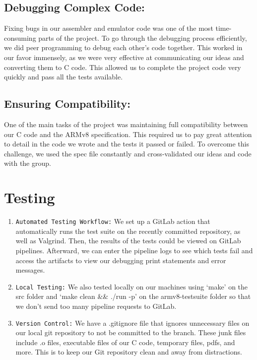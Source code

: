 \documentclass[11pt]{article}
\begin{document}
\subsection{Debugging Complex Code:}
Fixing bugs in our assembler and emulator code was one of the most time-consuming parts of the project. To go through the debugging process efficiently, we did peer programming to debug each other's code together. This worked in our favor immensely, as we were very effective at communicating our ideas and converting them to C code. This allowed us to complete the project code very quickly and pass all the tests available. 

\subsection{Ensuring Compatibility:}
One of the main tasks of the project was maintaining full compatibility between our C code and the ARMv8 specification. This required us to pay great attention to detail in the code we wrote and the tests it passed or failed. To overcome this challenge, we used the spec file constantly and cross-validated our ideas and code with the group.

\section{Testing}
\begin{enumerate}
    \item \verb|Automated Testing Workflow:| We  set up a GitLab action that automatically runs the test suite on the recently committed repository, as well as Valgrind. Then, the results of the tests could be viewed on GitLab pipelines. Afterward, we can enter the pipeline logs to see which tests fail and access the artifacts to view our debugging print statements and error messages.
    
    \item \verb|Local Testing:|  We also tested locally on our machines using ‘make’ on the src folder and ‘make clean \&\& ./run -p’ on the armv8-testsuite folder so that we don’t send too many pipeline requests to GitLab.
    
    \item \verb|Version Control:|  We have a .gitignore file that ignores unnecessary files on our local git repository to not be committed to the branch. These junk files include .o files, executable files of our C code, temporary files, pdfs, and more. This is to keep our Git repository clean and away from distractions. 
\end{enumerate}
\end{document}
